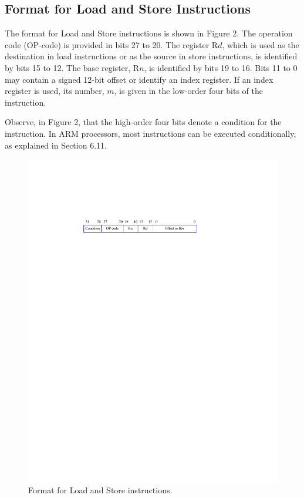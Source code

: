 \documentclass[11pt, twoside, pdftex]{article}
\begin{document}
\subsection{Format for Load and Store Instructions}
\label{sec:machine_code}

The format for Load and Store instructions is shown in Figure 2.
The operation code (OP-code) is provided in bits 27 to 20.
The register R$d$, which is used as the destination in load instructions or as the 
source in store instructions, is
identified by bits 15 to 12.
The base register, R$n$, is identified by bits 19 to 16.
Bits 11 to 0 may contain a signed 12-bit offset or identify
an index register.
If an index register is used, its number, $m$, is given in 
the low-order four bits of the instruction.

Observe, in Figure 2, that the high-order four bits denote a
condition for the instruction. In ARM processors, most
instructions can be executed conditionally, as explained in
Section 6.11.

\begin{figure}[H]
   \begin{center}
      \includegraphics[scale=1]{figures/figure2.pdf}
   \caption{Format for Load and Store instructions.} 
	 \label{fig:2}
	 \end{center}
\end{figure} 
\end{document}
